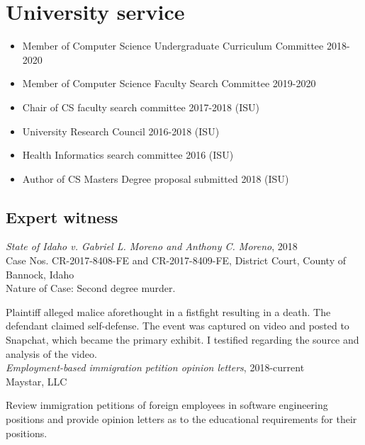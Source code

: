 \documentclass[margin,line]{res}
\begin{document}
\begin{resume}
\section{\sc University service}
\begin{itemize}[label={},leftmargin=0mm]
  \setlength\itemsep{0em}
  \item Member of Computer Science Undergraduate Curriculum Committee 2018-2020
  \item Member of Computer Science Faculty Search Committee 2019-2020
  \item Chair of CS faculty search committee 2017-2018 (ISU)
  \item University Research Council 2016-2018 (ISU)
  \item Health Informatics search committee 2016 (ISU)
  \item Author of CS Masters Degree proposal submitted 2018 (ISU)
\end{itemize}

\begin{LONG}

\section{\sc Expert witness}
\textit{State of Idaho v. Gabriel L. Moreno and Anthony C. Moreno}, 2018 \\
Case Nos. CR-2017-8408-FE and CR-2017-8409-FE, District Court, County of Bannock, Idaho \\
Nature of Case: Second degree murder.
\par \hangindent=0.7cm \parindent=0.7cm \parskip=0.0cm Plaintiff alleged malice aforethought in a fistfight resulting in a death. The defendant claimed self-defense. The event was captured on video and posted to Snapchat, which became the primary exhibit. I testified regarding the source and analysis of the video.\\

\parindent=0.0cm \textit{Employment-based immigration petition opinion letters}, 2018-current \\
Maystar, LLC
\par \hangindent=0.7cm \parindent=0.7cm \parskip=0.0cm Review immigration petitions of foreign employees in software engineering positions and provide opinion letters as to the educational requirements for their positions.


\end{LONG}
\end{resume}
\end{document}
